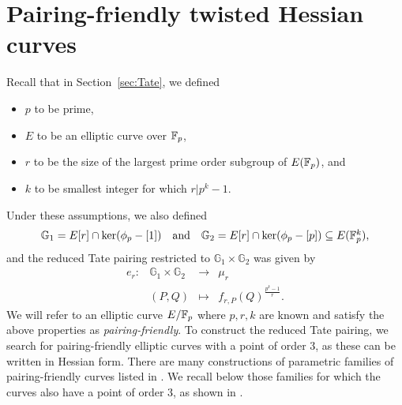 \section{Pairing-friendly twisted Hessian curves}
\label{sec:curves}

Recall that in Section~\ref{sec:Tate}, we defined
\begin{itemize}
\item $p$ to be prime,
\item $E$ to be an elliptic curve over $\mathbb{F}_{p}$,
\item $r$ to be the size of the largest prime order subgroup of $E(\mathbb{F}_{p})$, and
\item $k$ to be smallest integer for which $r | p^{k}-1$.
\end{itemize}
Under these assumptions, we also defined 
\[\begin{array}{ccc}
\mathbb{G}_{1} = E[r] \cap \ker(\phi_{p} - [1]) & \text{and} & \mathbb{G}_{2} = E[r] \cap \ker(\phi_{p} - [p]) \subseteq E(\mathbb{F}_{p}^{k}),
\end{array}\]
and the reduced Tate pairing restricted to $\mathbb{G}_{1} \times \mathbb{G}_{2}$ was given by
\[\begin{array}{rccc}
e_{r}:& \mathbb{G}_{1} \times \mathbb{G}_{2} & \longrightarrow & \mu_{r} \\
& (P,Q) & \mapsto & f_{r,P}(Q)^{\frac{p^{k}-1}{r}}.
\end{array}\]
We will refer to an elliptic curve $E/\mathbb{F}_{p}$ where $p,r,k$ are known and satisfy the above properties as \emph{pairing-friendly}. To construct the reduced Tate pairing, we search for pairing-friendly elliptic curves with a point of order 3, as these can be written in Hessian form. There are many constructions of parametric families of pairing-friendly curves listed in \cite{2010/freeman}. We recall below those families for which the curves also have a point of order 3, as shown in \cite[Section 5]{2015/hessian}.



